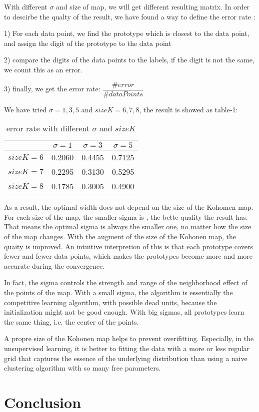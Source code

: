 \documentclass[a4paper, 12pt]{article}
\begin{document}
With different $\sigma$ and size of map, we will get different resulting matrix. In order to descirbe the qualty of the result, we have found a way to define the error rate :

1) For each data point, we find the prototype which is closest to the data point, and assign the digit of the prototype to the data point

2) compare the digits of the data points to the labels, if the digit is not the same, we count this as an error.

3) finally, we get the error rate: $\dfrac{\#error}{\#dataPoints}$

We have tried $\sigma = 1, 3, 5$ and $sizeK = 6, 7, 8$, the result is showed as table-1:

\begin{table}[!hbp]
\centering
\begin{tabular}{|c|c|c|c|}
\hline
 & $\sigma = 1$ & $\sigma = 3$ & $\sigma = 5$\\
\hline
$sizeK = 6$ &  0.2060 & 0.4455 & 0.7125\\
\hline
$sizeK = 7$ & 0.2295 & 0.3130 & 0.5295\\
\hline
$sizeK = 8$ & 0.1785 & 0.3005 & 0.4900\\
\hline
\end{tabular}
\caption{error rate with different $\sigma$ and $sizeK$}
\end{table}

As a result, the optimal width does not depend on the size of the Kohomen map. For each size of the map, the smaller sigma is , the bette quality the result has. That means the optimal sigma is always the smaller one, no matter how the size of the map changes. With the augment of the size of the Kohonen map, the quaity is improved. An intuitive interpretion of this is that each prototype covers fewer and fewer data points, which makes the prototypes become more and more accurate during the convergence.

In fact, the sigma controls the strength and range of the neighborhood effect of the points of the map. With a small sigma, the algorithm is essentially the competitive learning algorithm, with possible dead units, because the initialization might not be good enough. With big sigmas, all prototypes learn the same thing, i.e. the center of the points.

A propre size of the Kohonen map helps to prevent overifitting. Especially, in the unsupervised learning, it is better to fitting the data with a more or less regular grid that captures the essence of the underlying distribution than using a naive clustering algorithm with so many free parameters.



\section{Conclusion}
\end{document}
